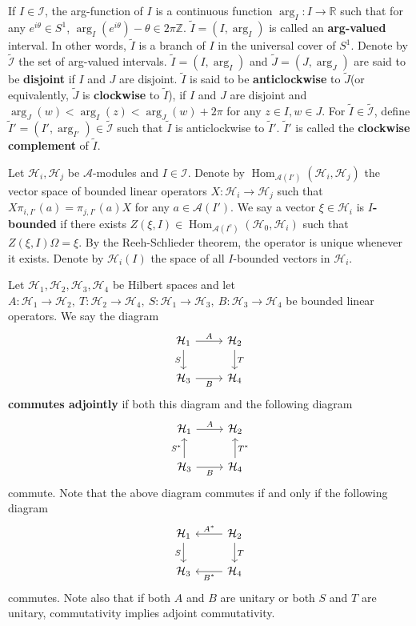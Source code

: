 \documentclass{article}
\newcommand{\hilb}{\mathcal{H}}
\newcommand{\R}{\mathbb{R}}
\newcommand{\A}{\mathcal{A}}
\newcommand{\Z}{\mathbb{Z}}
\begin{document}
If $I\in\mathcal{I}$, the arg-function of $I$ is a continuous function $\arg_I: I \to \R$ such that 
for any $e^{i\theta} \in S^1$, $\arg_I(e^{i\theta}) - \theta \in 2\pi\Z$. $\widetilde{I} = (I, \arg_I)$ is called an 
\textbf{arg-valued} interval. In other words, $\widetilde{I}$ is a branch of $I$ in the universal cover of $S^1$. 
Denote by $\widetilde{\mathcal{I}}$ the set of arg-valued intervals. 
$\widetilde{I}=(I, \arg_I)$ and $\widetilde{J}=(J,\arg_J)$ are said to be \textbf{disjoint} if $I $ and $J$ are disjoint. $\widetilde{I}$ is said to be \textbf{anticlockwise} to $\widetilde{J}$(or equivalently, $\widetilde{J}$ is \textbf{clockwise} to $\widetilde{I}$), if $I$ and $J$ are disjoint and $\arg_J(w)< \arg_I(z) <\arg_J(w)+2\pi$ for any 
$z\in I, w\in J$. For $\widetilde{I}\in\widetilde{\mathcal{I}}$, define $\widetilde{I}' = (I', \arg_{I'}) \in \widetilde{\mathcal{I}}$ such that $\widetilde{I}$ is anticlockwise to $\widetilde{I}'$. $\widetilde{I}'$ is called the \textbf{clockwise complement} of $\widetilde{I}$.

Let $\hilb_i, \hilb_j$ be $\A$-modules and $I\in\mathcal{I}$. Denote 
by $\operatorname{Hom}_{\A(I')}(\hilb_i,\hilb_j)$ the vector space of bounded linear operators
$X: \hilb_i \to \hilb_j$ such that 
$X\pi_{i,I'}(a) =  \pi_{j,I'}(a)X$ for any $a\in\A(I')$. 
We say a vector $\xi\in\hilb_i$ is \textbf{$I$-bounded} if there exists
$Z(\xi, I)\in\operatorname{Hom}_{\A(I^c)}(\hilb_0, \hilb_i)$ such that 
$Z(\xi, I)\Omega = \xi$. By the Reeh-Schlieder theorem, the operator is unique whenever it exists. Denote by $\hilb_i(I)$ the space of all $I$-bounded vectors in $\hilb_i.$

Let $\hilb_1, \hilb_2, \hilb_3, \hilb_4$ be Hilbert spaces and let
$A: \hilb_1 \to \hilb_2, \  T:\hilb_2 \to \hilb_4, \ S: \hilb_1 \to \hilb_3, \ B:\hilb_3 \to \hilb_4$ be bounded linear 
operators. 
We say the diagram
\[
\begin{tikzcd}
    \hilb_1 \arrow{r}{A} \arrow[swap]{d}{S}  &\hilb_2 \arrow{d}{T} \\
    \hilb_3  \arrow[swap]{r}{B} &\hilb_4
\end{tikzcd}
\]
\textbf{commutes adjointly} if both this diagram and the following diagram 
\[
\begin{tikzcd}
    \hilb_1 \arrow{r}{A}   &\hilb_2  \\
    \hilb_3  \arrow[swap]{r}{B}\arrow{u}{S^*} &\hilb_4 \arrow[swap]{u}{T^*}
\end{tikzcd}
\] commute. Note that the above diagram commutes if and only if the following diagram 
\[
\begin{tikzcd}
    \hilb_1  \arrow[swap]{d}{S}  &\hilb_2 \arrow{d}{T}\arrow[swap]{l}{A^*} \\
    \hilb_3   &\hilb_4 \arrow{l}{B^*}
\end{tikzcd}
\] commutes. Note also that if both $A$ and $B$ are unitary or both  $S$ and $T$ are unitary, commutativity implies adjoint commutativity. 
\end{document}
